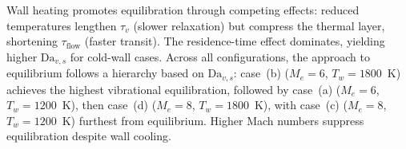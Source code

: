 Wall heating promotes equilibration through competing effects: reduced temperatures lengthen $\tau_v$ (slower relaxation) but compress the thermal layer, shortening $\tau_{\mathrm{flow}}$ (faster transit). The residence-time effect dominates, yielding higher $\mathrm{Da}_{v,s}$ for cold-wall cases. Across all configurations, the approach to equilibrium follows a hierarchy based on $\mathrm{Da}_{v,s}$: case~(b) ($M_e = 6$, $T_w = 1800$~K) achieves the highest vibrational equilibration, followed by case~(a) ($M_e = 6$, $T_w = 1200$~K), then case~(d) ($M_e = 8$, $T_w = 1800$~K), with case~(c) ($M_e = 8$, $T_w = 1200$~K) furthest from equilibrium. Higher Mach numbers suppress equilibration despite wall cooling.






